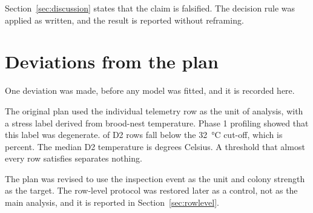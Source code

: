 ﻿\documentclass[review,12pt]{elsarticle}
\begin{document}
Section~\ref{sec:discussion} states that the claim is falsified.
The decision rule was applied as written, and the result is reported without
reframing.

\section{Deviations from the plan}
\label{app:deviations}

One deviation was made, before any model was fitted, and it is recorded here.

The original plan used the individual telemetry row as the unit of analysis,
with a stress label derived from brood-nest temperature.
Phase 1 profiling showed that this label was degenerate.
\LeakDTwoNBelow{} of \LeakDTwoNRows{} D2 rows fall below the
\SI{32}{\celsius} cut-off, which is \LeakDTwoPctBelow{} percent.
The median D2 temperature is \LeakDTwoMedianC{} degrees Celsius.
A threshold that almost every row satisfies separates nothing.

The plan was revised to use the inspection event as the unit and colony strength
as the target.
The row-level protocol was restored later as a control, not as the main
analysis, and it is reported in Section~\ref{sec:rowlevel}.



\end{document}
